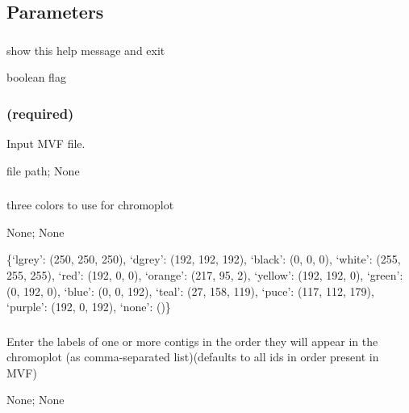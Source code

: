 \documentclass[letterpaper,11pt,english]{sphinxmanual}
\begin{document}
\subsection{Parameters}
\label{\detokenize{prog_desc:id138}}

\subsubsection{}
\label{\detokenize{prog_desc:id139}}
 show this help message and exit

 boolean flag


\subsubsection{ (required)}
\label{\detokenize{prog_desc:id140}}
 Input MVF file.

 file path;  None


\subsubsection{}
\label{\detokenize{prog_desc:colors}}
 three colors to use for chromoplot

 None;  None

 \{‘lgrey’: (250, 250, 250), ‘dgrey’: (192, 192, 192), ‘black’: (0, 0, 0), ‘white’: (255, 255, 255), ‘red’: (192, 0, 0), ‘orange’: (217, 95, 2), ‘yellow’: (192, 192, 0), ‘green’: (0, 192, 0), ‘blue’: (0, 0, 192), ‘teal’: (27, 158, 119), ‘puce’: (117, 112, 179), ‘purple’: (192, 0, 192), ‘none’: ()\}


\subsubsection{}
\label{\detokenize{prog_desc:contig-ids-contigids-contigs}}
 Enter the labels of one or more contigs in the order they will appear in the chromoplot (as comma-separated list)(defaults to all ids in order present in MVF)

 None;  None
\end{document}
